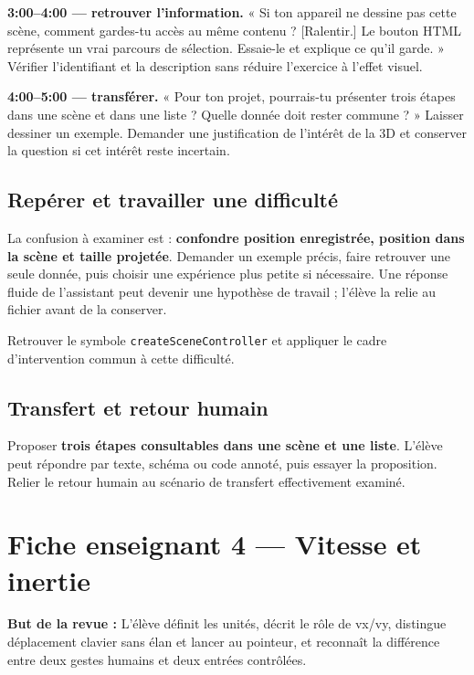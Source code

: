 \documentclass[
  canadien,
  11pt,
  a4paper,
]{report}
\begin{document}
\textbf{3:00--4:00 --- retrouver l'information.} « Si ton appareil ne
dessine pas cette scène, comment gardes-tu accès au même contenu ?
{[}Ralentir.{]} Le bouton HTML représente un vrai parcours de sélection.
Essaie-le et explique ce qu'il garde. » Vérifier l'identifiant et la
description sans réduire l'exercice à l'effet visuel.

\textbf{4:00--5:00 --- transférer.} « Pour ton projet, pourrais-tu
présenter trois étapes dans une scène et dans une liste ? Quelle donnée
doit rester commune ? » Laisser dessiner un exemple. Demander une
justification de l'intérêt de la 3D et conserver la question si cet
intérêt reste incertain.

\section{Repérer et travailler une
difficulté}\label{repuxe9rer-et-travailler-une-difficultuxe9-2}

La confusion à examiner est : \textbf{confondre position enregistrée,
position dans la scène et taille projetée}. Demander un exemple précis,
faire retrouver une seule donnée, puis choisir une expérience plus
petite si nécessaire. Une réponse fluide de l'assistant peut devenir une
hypothèse de travail ; l'élève la relie au fichier avant de la
conserver.

Retrouver le symbole \texttt{create\allowbreak{}Scene\allowbreak{}Controller} et appliquer le
cadre d'intervention commun à cette difficulté.

\section{Transfert et retour humain}\label{transfert-et-retour-humain-2}

Proposer \textbf{trois étapes consultables dans une scène et une liste}.
L'élève peut répondre par texte, schéma ou code annoté, puis essayer la
proposition. Relier le retour humain au scénario de transfert
effectivement examiné.

\chapter{Fiche enseignant 4 --- Vitesse et
inertie}\label{fiche-enseignant-4-vitesse-et-inertie}

\textbf{But de la revue :} L'élève définit les unités, décrit le rôle de
vx/vy, distingue déplacement clavier sans élan et lancer au pointeur, et
reconnaît la différence entre deux gestes humains et deux entrées
contrôlées.
\end{document}
